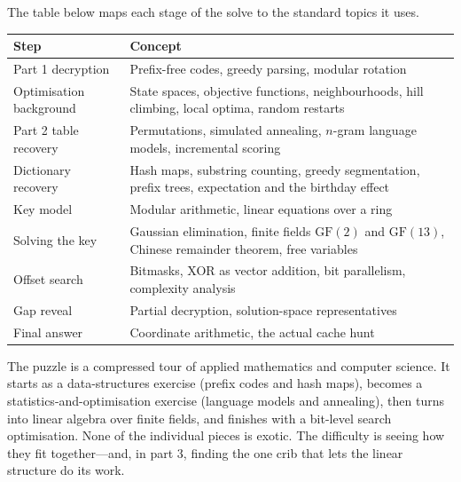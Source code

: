 \documentclass[11pt]{article}
\begin{document}
The table below maps each stage of the solve to the standard topics it uses.

\begin{center}
\small
\renewcommand{\arraystretch}{1.3}
\begin{tabular}{@{}p{}p{}@{}}
\toprule
\textbf{Step} & \textbf{Concept} \\
\midrule
Part 1 decryption & Prefix-free codes, greedy parsing, modular rotation \\
Optimisation background & State spaces, objective functions, neighbourhoods, hill climbing, local optima, random restarts \\
Part 2 table recovery & Permutations, simulated annealing, $n$-gram language models, incremental scoring \\
Dictionary recovery & Hash maps, substring counting, greedy segmentation, prefix trees, expectation and the birthday effect \\
Key model & Modular arithmetic, linear equations over a ring \\
Solving the key & Gaussian elimination, finite fields $\mathrm{GF}(2)$ and $\mathrm{GF}(13)$, Chinese remainder theorem, free variables \\
Offset search & Bitmasks, XOR as vector addition, bit parallelism, complexity analysis \\
Gap reveal & Partial decryption, solution-space representatives \\
Final answer & Coordinate arithmetic, the actual cache hunt \\
\bottomrule
\end{tabular}
\end{center}

\begin{keyidea}
The puzzle is a compressed tour of applied mathematics and computer science.
It starts as a data-structures exercise (prefix codes and hash maps), becomes a
statistics-and-optimisation exercise (language models and annealing), then
turns into linear algebra over finite fields, and finishes with a bit-level
search optimisation.  None of the individual pieces is exotic.  The difficulty
is seeing how they fit together---and, in part 3, finding the one crib that
lets the linear structure do its work.
\end{keyidea}
\end{document}
